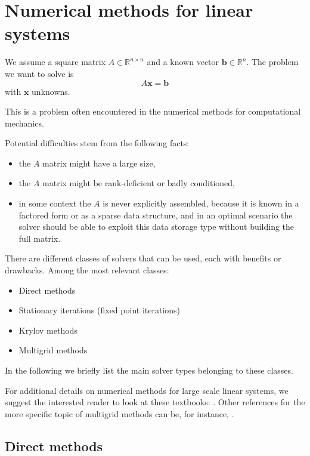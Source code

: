 \documentclass{digitaldynamics}
\def\vect#1{\bm{#1}}
\def\matr#1{{#1}}
\begin{document}
\newpage
\section{Numerical methods for linear systems}

We assume a square matrix $\matr{A}  \in \mathbb{R}^{n \times n}$ and a known vector $\vect{b} \in \mathbb{R}^n$. 
The problem we want to solve is
\[
\matr{A} \vect{x} = \vect{b}
\]
with $\vect{x}$ unknowns.

This is a problem often encountered in the numerical methods for computational mechanics.

Potential difficulties stem from the following facts: 

\begin{itemize}
	\item the $\matr{A}$ matrix might have a large size,
	\item the $\matr{A}$ matrix might be rank-deficient or badly conditioned,
	\item in some context the $\matr{A}$ is never explicitly assembled, because it is known in a factored form or as a sparse data structure, and in an optimal scenario the solver should be able to exploit this data storage type without building the full matrix.
\end{itemize}

There are different classes of solvers that can be used, each with benefits or drawbacks. Among the most relevant classes:
\begin{itemize}
	\item Direct methods
	\item Stationary iterations (fixed point iterations)
	\item Krylov methods
	\item Multigrid methods
\end{itemize}
In the following we briefly list the main solver types belonging to these classes.

For additional details on numerical methods for large scale linear systems, we suggest the interested reader to look at these textbooks: \cite{Saad2003,greenbaum1997}. Other references for the more specific topic of multigrid methods can be, for instance, \cite{brandt2011multigrid,trottenberg2000multigrid}.


\subsection{Direct methods}
\end{document}
